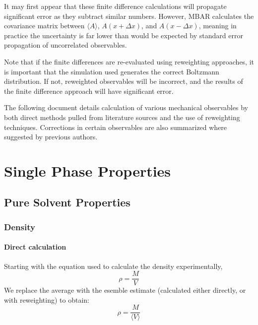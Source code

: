 \documentclass[aps,pre,twocolumn,nofootinbib,superscriptaddress,linenumbers,10pt, draft,tightenlines]{revtex4-1}
\begin{document}
It may first appear that these finite difference calculations will
propagate significant error as they subtract similar numbers.
However, MBAR calculates the covariance matrix between $\langle A
\rangle$, $A(x+\Delta x)$, and $A(x-\Delta x)$, meaning in practice
the uncertainty is far lower than would be expected by standard error
propagation of uncorrelated observables.


Note that if the finite differences are re-evaluated using reweighting
approaches, it is important that the simulation used generates the
correct Boltzmann distribution. If not, reweighted observables will be
incorrect, and the results of the finite difference approach will have
significant error.

The following document details calculation of various mechanical observables
by both direct methods pulled from literature sources and the use of 
reweighting techniques. Corrections in certain observables are also summarized
where suggested by previous authors. 



\section{Single Phase Properties}
\subsection{Pure Solvent Properties}
\subsubsection{Density}
\paragraph{Direct calculation}
Starting with the equation used to calculate the density experimentally, 
\begin{equation} \rho = \frac{M}{V} \end{equation}
We replace the average with the esemble estimate (calculated either directly, or with reweighting) to obtain: 
\begin{equation} \rho = \frac{M}{\langle V \rangle} \end{equation}
\end{document}
